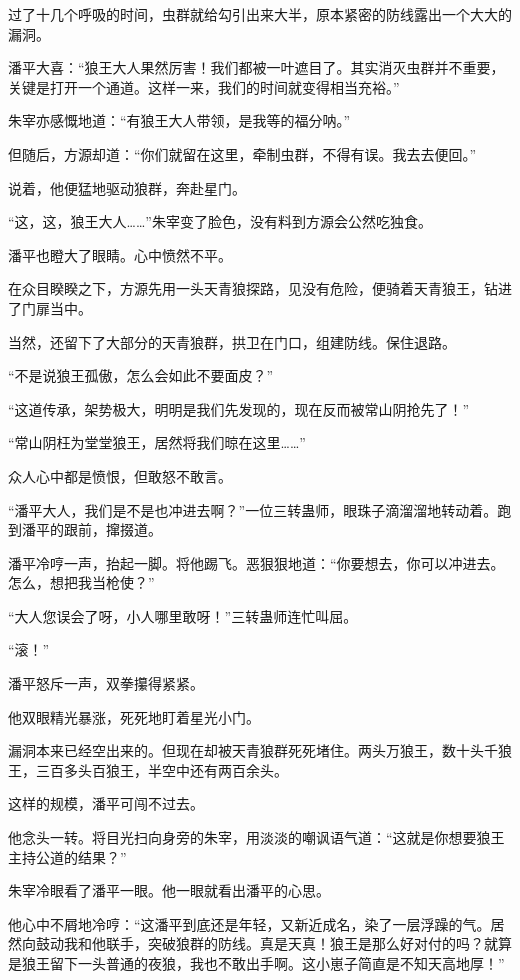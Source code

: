 \begin{this_body}
过了十几个呼吸的时间，虫群就给勾引出来大半，原本紧密的防线露出一个大大的漏洞。

潘平大喜：“狼王大人果然厉害！我们都被一叶遮目了。其实消灭虫群并不重要，关键是打开一个通道。这样一来，我们的时间就变得相当充裕。”

朱宰亦感慨地道：“有狼王大人带领，是我等的福分呐。”

但随后，方源却道：“你们就留在这里，牵制虫群，不得有误。我去去便回。”

说着，他便猛地驱动狼群，奔赴星门。

“这，这，狼王大人……”朱宰变了脸色，没有料到方源会公然吃独食。

潘平也瞪大了眼睛。心中愤然不平。

在众目睽睽之下，方源先用一头天青狼探路，见没有危险，便骑着天青狼王，钻进了门扉当中。

当然，还留下了大部分的天青狼群，拱卫在门口，组建防线。保住退路。

“不是说狼王孤傲，怎么会如此不要面皮？”

“这道传承，架势极大，明明是我们先发现的，现在反而被常山阴抢先了！”

“常山阴枉为堂堂狼王，居然将我们晾在这里……”

众人心中都是愤恨，但敢怒不敢言。

“潘平大人，我们是不是也冲进去啊？”一位三转蛊师，眼珠子滴溜溜地转动着。跑到潘平的跟前，撺掇道。

潘平冷哼一声，抬起一脚。将他踢飞。恶狠狠地道：“你要想去，你可以冲进去。怎么，想把我当枪使？”

“大人您误会了呀，小人哪里敢呀！”三转蛊师连忙叫屈。

“滚！”

潘平怒斥一声，双拳攥得紧紧。

他双眼精光暴涨，死死地盯着星光小门。

漏洞本来已经空出来的。但现在却被天青狼群死死堵住。两头万狼王，数十头千狼王，三百多头百狼王，半空中还有两百余头。

这样的规模，潘平可闯不过去。

他念头一转。将目光扫向身旁的朱宰，用淡淡的嘲讽语气道：“这就是你想要狼王主持公道的结果？”

朱宰冷眼看了潘平一眼。他一眼就看出潘平的心思。

他心中不屑地冷哼：“这潘平到底还是年轻，又新近成名，染了一层浮躁的气。居然向鼓动我和他联手，突破狼群的防线。真是天真！狼王是那么好对付的吗？就算是狼王留下一头普通的夜狼，我也不敢出手啊。这小崽子简直是不知天高地厚！”


\end{this_body}

